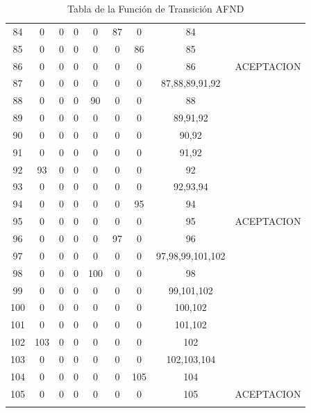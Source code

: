 \begin{longtable}{||c||ccccccc||c||}
84  & 0   & 0  & 0  & 0   & 87  & 0   & 84                      &             \\
85  & 0   & 0  & 0  & 0   & 0   & 86  & 85                      &             \\
86  & 0   & 0  & 0  & 0   & 0   & 0   & 86                      & ACEPTACION  \\
87  & 0   & 0  & 0  & 0   & 0   & 0   & 87,88,89,91,92          &             \\
88  & 0   & 0  & 0  & 90  & 0   & 0   & 88                      &             \\
89  & 0   & 0  & 0  & 0   & 0   & 0   & 89,91,92                &             \\
90  & 0   & 0  & 0  & 0   & 0   & 0   & 90,92                   &             \\
91  & 0   & 0  & 0  & 0   & 0   & 0   & 91,92                   &             \\
92  & 93  & 0  & 0  & 0   & 0   & 0   & 92                      &             \\
93  & 0   & 0  & 0  & 0   & 0   & 0   & 92,93,94                &             \\
94  & 0   & 0  & 0  & 0   & 0   & 95  & 94                      &             \\
95  & 0   & 0  & 0  & 0   & 0   & 0   & 95                      & ACEPTACION  \\
96  & 0   & 0  & 0  & 0   & 97  & 0   & 96                      &             \\
97  & 0   & 0  & 0  & 0   & 0   & 0   & 97,98,99,101,102        &             \\
98  & 0   & 0  & 0  & 100 & 0   & 0   & 98                      &             \\
99  & 0   & 0  & 0  & 0   & 0   & 0   & 99,101,102              &             \\
100 & 0   & 0  & 0  & 0   & 0   & 0   & 100,102                 &             \\
101 & 0   & 0  & 0  & 0   & 0   & 0   & 101,102                 &             \\
102 & 103 & 0  & 0  & 0   & 0   & 0   & 102                     &             \\
103 & 0   & 0  & 0  & 0   & 0   & 0   & 102,103,104             &             \\
104 & 0   & 0  & 0  & 0   & 0   & 105 & 104                     &             \\
105 & 0   & 0  & 0  & 0   & 0   & 0   & 105                     & ACEPTACION  \\
\hline
\hline

\caption{Tabla de la Función de Transición AFND}
\label{AFNDnumeros}
\end{longtable}


